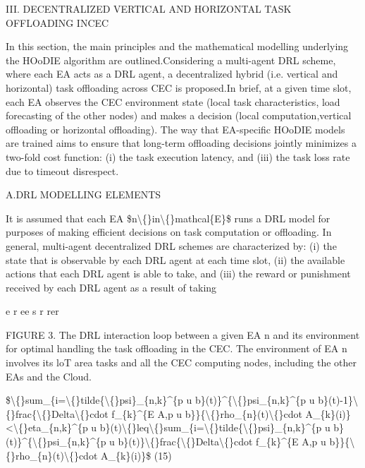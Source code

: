 \documentclass{article}
\begin{document}
III. DECENTRALIZED VERTICAL AND HORIZONTAL TASK OFFLOADING INCEC

In this section, the main principles and the mathematical modelling underlying the HOoDIE algorithm are outlined.Considering a multi-agent DRL scheme, where each EA acts as a DRL agent, a decentralized hybrid (i.e. vertical and horizontal) task offloading across CEC is proposed.In brief, at a given time slot, each EA observes the CEC environment state (local task characteristics, load forecasting of the other nodes) and makes a decision (local computation,vertical offloading or horizontal offloading). The way that EA-specific HOoDIE models are trained aims to ensure that long-term offloading decisions jointly minimizes a two-fold cost function: (i) the task execution latency, and (iii) the task loss rate due to timeout disrespect.

A.DRL MODELLING ELEMENTS

It is assumed that each EA \$n\textbackslash\{\}in\textbackslash\{\}mathcal\{E\}\$ runs a DRL model for purposes of making efficient decisions on task computation or offloading. In general, multi-agent decentralized DRL schemes are characterized by: (i) the state that is observable by each DRL agent at each time slot, (ii) the available actions that each DRL agent is able to take, and (iii) the reward or punishment received by each DRL agent as a result of taking

e r ee s r  rer

FIGURE 3. The DRL interaction loop between a given EA n and its environment for optimal handling the task offloading in the CEC. The environment of EA n involves its loT area tasks and all the CEC computing nodes, including the other EAs and the Cloud.

\$\textbackslash\{\}sum\_\{i=\textbackslash\{\}tilde\{\textbackslash\{\}psi\}\_\{n,k\}\textasciicircum{}\{p u b\}(t)\}\textasciicircum{}\{\textbackslash\{\}psi\_\{n,k\}\textasciicircum{}\{p u b\}(t)-1\}\textbackslash\{\}frac\{\textbackslash\{\}Delta\textbackslash\{\}cdot f\_\{k\}\textasciicircum{}\{E A,p u b\}\}\{\textbackslash\{\}rho\_\{n\}(t)\textbackslash\{\}cdot A\_\{k\}(i)\}<\textbackslash\{\}eta\_\{n,k\}\textasciicircum{}\{p u b\}(t)\textbackslash\{\}leq\textbackslash\{\}sum\_\{i=\textbackslash\{\}tilde\{\textbackslash\{\}psi\}\_\{n,k\}\textasciicircum{}\{p u b\}(t)\}\textasciicircum{}\{\textbackslash\{\}psi\_\{n,k\}\textasciicircum{}\{p u b\}(t)\}\textbackslash\{\}frac\{\textbackslash\{\}Delta\textbackslash\{\}cdot f\_\{k\}\textasciicircum{}\{E A,p u b\}\}\{\textbackslash\{\}rho\_\{n\}(t)\textbackslash\{\}cdot A\_\{k\}(i)\}\$ (15)
\end{document}
